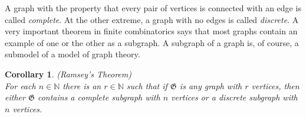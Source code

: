 \documentclass[titlepage, oneside]{amsbook}
\theoremstyle{plain}
\newtheorem{corollary}{Corollary}
\theoremstyle{definition}
\theoremstyle{remark}
\newcommand{\mg}{\ensuremath{\mathfrak{G}}}
\newcommand{\nat}{\ensuremath{\mathbb{N}}}
\begin{document}
A graph with the property that every pair of vertices is connected with
an edge is called \emph{complete}.  At the other extreme, a graph with
no edges is called \emph{discrete}.  A very important theorem in finite
combinatorics says that most graphs contain an example of one or the
other as a subgraph.  A subgraph of a graph is, of course, a submodel
of a model of graph theory.

\begin{corollary} (Ramsey's Theorem)\\
 For each $n \in \nat$ there is an
$r \in \nat$ such
that if $\mg$ is any graph with $r$ vertices, then either $\mg$
contains a
complete subgraph with $n$ vertices or a discrete subgraph with $n$
vertices.

\end{corollary}

\end{document}
